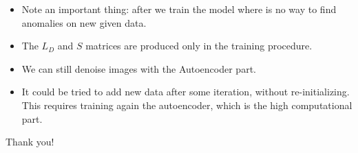 \documentclass{beamer}
\theoremstyle{plain}
\theoremstyle{definition}
\theoremstyle{remark}
\begin{document}
\begin{frame}
	\begin{itemize}
		\item Note an important thing: after we train the model where is no way to find anomalies on new given data.
		\item The $L_D$ and $S$ matrices are produced only in the training procedure.
		\item We can still denoise images with the Autoencoder part.
		\item It could be tried to add new data after some iteration, without re-initializing. This requires training again the autoencoder, which is the high computational part.
	\end{itemize}
\end{frame}

\begin{frame}
	\Huge{\centerline{Thank you!}} 
\end{frame}

\nocite{RAE}
\nocite{DATA}
\nocite{RPCA}
\nocite{PROX}






\end{document}
